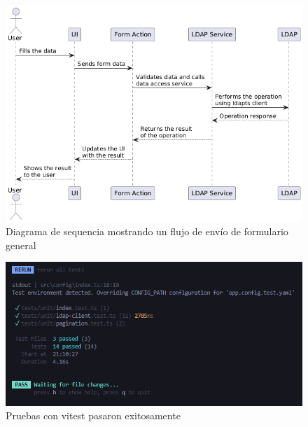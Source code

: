\begin{figure}[h]
    \centering
    \includegraphics[width=\linewidth]{images/puml/sequence diagram form submission/sequence diagram form submission.png}
    \caption{Diagrama de sequencia mostrando un flujo de envío de formulario general}
    \label{fig:general-form-submission-diagram}
\end{figure}

\newpage
\begin{figure}[h]
    \centering
    \includegraphics[width=\linewidth]{images/vitest tests run successfully.png}
    \caption{Pruebas con vitest pasaron exitosamente}
    \label{fig:integration-tests-run-ok}
\end{figure}

